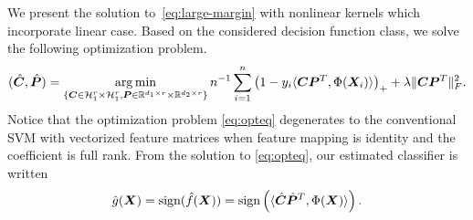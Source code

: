 \documentclass[12pt]{article}
\begin{document}
We present the solution to~\eqref{eq:large-margin} with nonlinear kernels which incorporate linear case. Based on the considered decision function class, we solve the following optimization problem.
\begin{align}
\label{eq:opteq}
(\hat {\bm C},\hat{\bm{P}}) = \operatorname*{arg\,min}_{\{\bm C\in\mathcal{H}_1^{r}\times \mathcal{H}_1^{r} ,\bm{P}\in \mathbb{R}^{d_1\times r}\times \mathbb{R}^{d_2\times r}\}}n^{-1}\sum_{i=1}^n \left(1-y_i\langle \bm C\bm{P}^T,\Phi(\bm X_i)\rangle\right)_++\lambda \lVert\bm C\bm{P}^T\rVert_F^2.
\end{align}
Notice that the optimization problem \eqref{eq:opteq} degenerates to the conventional SVM with vectorized feature matrices when feature mapping is identity and the coefficient is full rank. From the solution to \eqref{eq:opteq}, our estimated classifier is written 
\begin{align}\label{eq:formulation}\hat g(\bm X) = \text{sign}(\hat f(\bm X)) = \text{sign}\left(\langle \hat{\bm C} \hat{\bm{P}}^T,\Phi(\bm X)\rangle\right).\end{align}
\end{document}
